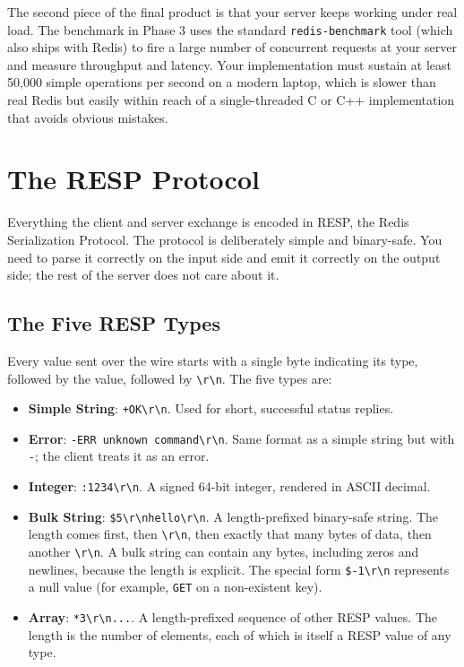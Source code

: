 \documentclass[11pt,a4paper]{article}
\begin{document}
The second piece of the final product is that your server keeps working under real load. The benchmark in Phase 3 uses the standard \texttt{redis-benchmark} tool (which also ships with Redis) to fire a large number of concurrent requests at your server and measure throughput and latency. Your implementation must sustain at least 50{,}000 simple operations per second on a modern laptop, which is slower than real Redis but easily within reach of a single-threaded C or C++ implementation that avoids obvious mistakes.

\section{The RESP Protocol}

Everything the client and server exchange is encoded in RESP, the Redis Serialization Protocol. The protocol is deliberately simple and binary-safe. You need to parse it correctly on the input side and emit it correctly on the output side; the rest of the server does not care about it.

\subsection{The Five RESP Types}
Every value sent over the wire starts with a single byte indicating its type, followed by the value, followed by \verb|\r\n|. The five types are:

\begin{itemize}
\item \textbf{Simple String}: \texttt{+OK\textbackslash r\textbackslash n}. Used for short, successful status replies.
\item \textbf{Error}: \texttt{-ERR unknown command\textbackslash r\textbackslash n}. Same format as a simple string but with \texttt{-}; the client treats it as an error.
\item \textbf{Integer}: \texttt{:1234\textbackslash r\textbackslash n}. A signed 64-bit integer, rendered in ASCII decimal.
\item \textbf{Bulk String}: \texttt{\$5\textbackslash r\textbackslash nhello\textbackslash r\textbackslash n}. A length-prefixed binary-safe string. The length comes first, then \verb|\r\n|, then exactly that many bytes of data, then another \verb|\r\n|. A bulk string can contain any bytes, including zeros and newlines, because the length is explicit. The special form \texttt{\$-1\textbackslash r\textbackslash n} represents a null value (for example, \texttt{GET} on a non-existent key).
\item \textbf{Array}: \texttt{*3\textbackslash r\textbackslash n...}. A length-prefixed sequence of other RESP values. The length is the number of elements, each of which is itself a RESP value of any type.
\end{itemize}
\end{document}
